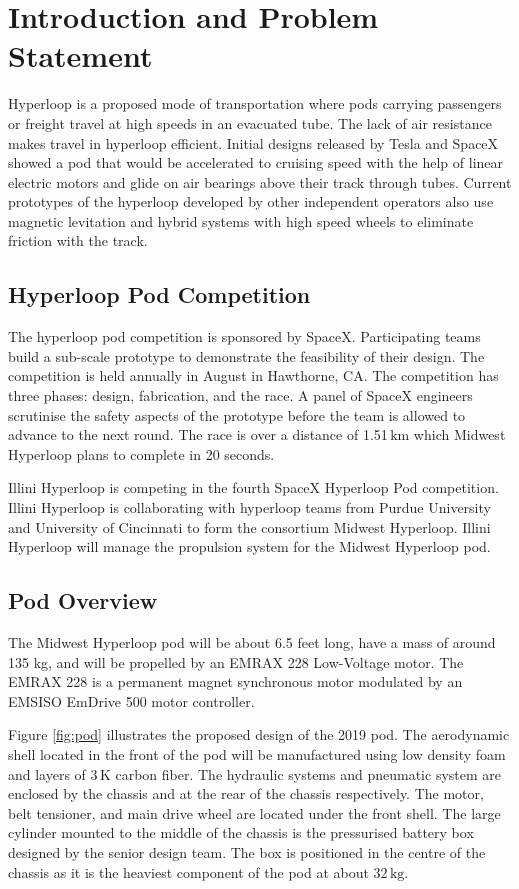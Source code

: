 \documentclass[11pt]{article}
\numberwithin{equation}{subsection} %
\newcommand{\unit}[1]{\ensuremath{\, \mathrm{#1}}}             %
\begin{document}
\pagebreak 
\section{Introduction and Problem Statement}
Hyperloop is a proposed mode of transportation where pods carrying passengers or freight travel at high speeds in an evacuated tube. The lack of air resistance makes travel in hyperloop efficient. Initial designs released by Tesla and SpaceX showed a pod that would be accelerated to cruising speed with the help of linear electric motors and glide on air bearings above their track through tubes. Current prototypes of the hyperloop developed by other independent operators also use magnetic levitation and hybrid systems with high speed wheels to eliminate friction with the track.

\subsection{Hyperloop Pod Competition}
The hyperloop pod competition is sponsored by SpaceX. Participating teams build a sub-scale prototype to demonstrate the feasibility of their design. The competition is held annually in August in Hawthorne, CA. The competition has three phases: design, fabrication, and the race. A panel of SpaceX engineers scrutinise the safety aspects of the prototype before the team is allowed to advance to the next round. The race is over a distance of 1.51\unit{km} which Midwest Hyperloop plans to complete in 20 seconds.

Illini Hyperloop is competing in the fourth SpaceX Hyperloop Pod competition. Illini Hyperloop is collaborating with hyperloop teams from Purdue University and University of Cincinnati to form the consortium Midwest Hyperloop. Illini Hyperloop will manage the propulsion system for the Midwest Hyperloop pod.

\subsection{Pod Overview}
The Midwest Hyperloop pod will be about 6.5 feet long, have a mass of around 135 kg, and will be propelled by an EMRAX 228 Low-Voltage motor. The EMRAX 228 is a permanent magnet synchronous motor modulated by an EMSISO EmDrive 500 motor controller.

Figure \ref{fig:pod} illustrates the proposed design of the 2019 pod. The aerodynamic shell located in the front of the pod will be manufactured using low density foam and layers of $3\unit{K}$ carbon fiber. The hydraulic systems and pneumatic system are enclosed by the chassis and at the rear of the chassis respectively. The motor, belt tensioner, and main drive wheel are located under the front shell. The large cylinder mounted to the middle of the chassis is the pressurised battery box designed by the senior design team. The box is positioned in the centre of the chassis as it is the heaviest component of the pod at about $32\unit{kg}$.
\end{document}

